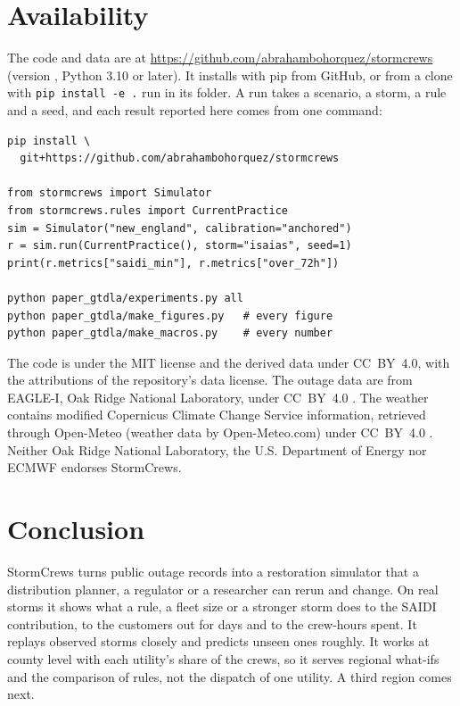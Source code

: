 \documentclass[conference,letterpaper]{IEEEtran}
\begin{document}
\section{Availability}\label{sec:avail}

The code and data are at \url{https://github.com/abrahambohorquez/stormcrews} (version \version, Python 3.10 or
later). It installs with pip from GitHub, or from a clone with \mbox{\texttt{pip install -e .}} run in its folder. A run takes a scenario, a
storm, a rule and a seed, and each result reported here comes from one command:\\[2pt]
\noindent\begin{minipage}{\columnwidth}
\begin{Verbatim}[fontsize=\scriptsize,frame=single,framesep=1mm]
pip install \
  git+https://github.com/abrahambohorquez/stormcrews

from stormcrews import Simulator
from stormcrews.rules import CurrentPractice
sim = Simulator("new_england", calibration="anchored")
r = sim.run(CurrentPractice(), storm="isaias", seed=1)
print(r.metrics["saidi_min"], r.metrics["over_72h"])

python paper_gtdla/experiments.py all
python paper_gtdla/make_figures.py   # every figure
python paper_gtdla/make_macros.py    # every number
\end{Verbatim}
\end{minipage}\vspace{5pt}

\noindent
The code is under the MIT license and the derived data under CC~BY~4.0, with the attributions of the repository's
data license. The outage data are from EAGLE-I, Oak Ridge National Laboratory, under CC~BY~4.0 \cite{eaglei2026data}.
The weather contains modified Copernicus Climate Change Service information, retrieved through Open-Meteo
(weather data by Open-Meteo.com) under CC~BY~4.0 \cite{c3s2018era5,zippenfenig2024openmeteo}. Neither Oak Ridge
National Laboratory, the U.S. Department of Energy nor ECMWF endorses StormCrews.

\section{Conclusion}

StormCrews turns public outage records into a restoration simulator that a distribution planner, a regulator or a
researcher can rerun and change. On \nStorms{} real storms it shows what a rule, a fleet size or a stronger storm does
to the SAIDI contribution, to the customers out for days and to the crew-hours spent. It replays observed storms
closely and predicts unseen ones roughly. It works at county level with each utility's share of the crews, so it serves
regional what-ifs and the comparison of rules, not the dispatch of one utility. A third region comes next.



\end{document}
